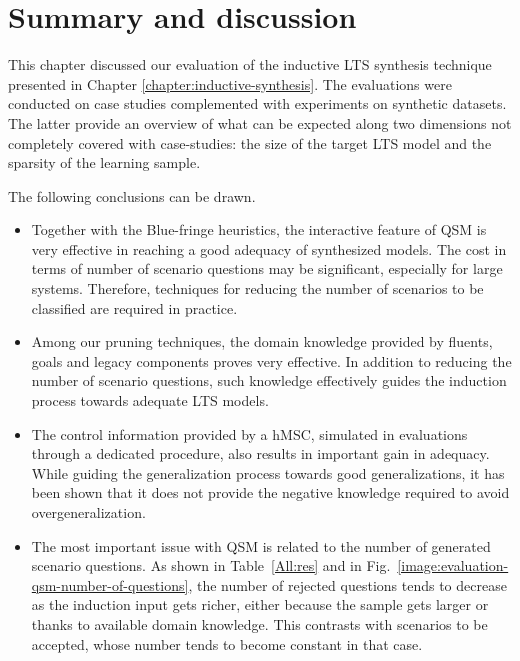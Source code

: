 \section{Summary and discussion\label{section:evaluation-summary}}

This chapter discussed our evaluation of the inductive LTS synthesis technique presented in Chapter \ref{chapter:inductive-synthesis}. The evaluations were conducted on case studies complemented with experiments on synthetic datasets. The latter provide an overview of what can be expected along two dimensions not completely covered with case-studies: the size of the target LTS model and the sparsity of the learning sample.  

The following conclusions can be drawn.
\begin{itemize}

\item Together with the Blue-fringe heuristics, the interactive feature of QSM is very effective in reaching a good adequacy of synthesized models. The cost in terms of number of scenario questions may be significant, especially for large systems. Therefore, techniques for reducing the number of scenarios to be classified are required in practice.

\item Among our pruning techniques, the domain knowledge provided by fluents, goals and legacy components proves very effective. In addition to reducing the number of scenario questions, such knowledge effectively guides the induction process towards adequate LTS models. 

\item The control information provided by a hMSC, simulated in evaluations through a dedicated procedure, also results in important gain in adequacy. While guiding the generalization process towards good generalizations, it has been shown that it does not provide the negative knowledge required to avoid overgeneralization.

\item The most important issue with QSM is related to the number of generated scenario questions. As shown in Table~\ref{All:res} and in Fig.~\ref{image:evaluation-qsm-number-of-questions}, the number of rejected questions tends to decrease as the induction input gets richer, either because the sample gets larger or thanks to available domain knowledge. This contrasts with scenarios to be accepted, whose number tends to become constant in that case.


\end{itemize}
